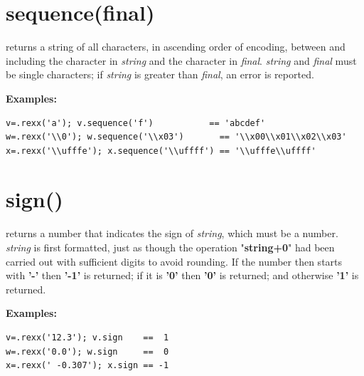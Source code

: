 \section{sequence(final)}\label{refsequen}
 returns a string of all characters, in ascending order of encoding,
between and including the character in \emph{string} and the
character in \emph{final}.
\emph{string} and \emph{final} must be single characters;
if \emph{string} is greater than \emph{final}, an error is
reported.
 
\textbf{Examples:}
\begin{lstlisting}
v=.rexx('a'); v.sequence('f')           == 'abcdef'
w=.rexx('\\0'); w.sequence('\\x03')       == '\\x00\\x01\\x02\\x03'
x=.rexx('\\ufffe'); x.sequence('\\uffff') == '\\ufffe\\uffff'
\end{lstlisting}

\section{sign()}\label{refsign}
returns a number that indicates the sign of \emph{string}, which
must be a number.
\emph{string} is first formatted, just as though the operation
"\textbf{string+0}" had been carried out with sufficient digits
to avoid rounding.
If the number then starts with \textbf{'-'} then \textbf{'-1'} is
returned; if it is \textbf{'0'} then \textbf{'0'} is returned; and
otherwise \textbf{'1'} is returned.
 
\textbf{Examples:}
\begin{lstlisting}
v=.rexx('12.3'); v.sign    ==  1
w=.rexx('0.0'); w.sign     ==  0
x=.rexx(' -0.307'); x.sign == -1
\end{lstlisting}


